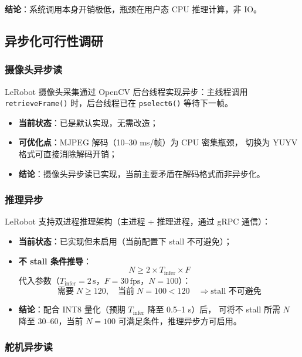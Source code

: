 \textbf{结论}：系统调用本身开销极低，瓶颈在用户态 CPU 推理计算，非 IO。

\subsection{异步化可行性调研}\label{sec:async-feasibility}

\subsubsection{摄像头异步读}

LeRobot 摄像头采集通过 OpenCV 后台线程实现异步：主线程调用
\texttt{retrieveFrame()} 时，后台线程已在 \texttt{pselect6()} 等待下一帧。
\begin{itemize}[leftmargin=2em]
  \item \textbf{当前状态}：已是默认实现，无需改造；
  \item \textbf{可优化点}：MJPEG 解码（10--30 ms/帧）为 CPU 密集瓶颈，
        切换为 YUYV 格式可直接消除解码开销；
  \item \textbf{结论}：摄像头异步读已实现，当前主要矛盾在解码格式而非异步化。
\end{itemize}

\subsubsection{推理异步}

LeRobot 支持双进程推理架构（主进程 + 推理进程，通过 gRPC 通信）：
\begin{itemize}[leftmargin=2em]
  \item \textbf{当前状态}：已实现但未启用（当前配置下 stall 不可避免）；
  \item \textbf{不 stall 条件推导}：
        \[
          N \geq 2 \times T_{\text{infer}} \times F
        \]
        代入参数（$T_{\text{infer}} = 2\,\text{s}$，$F = 30\,\text{fps}$，$N = 100$）：
        \[
          \text{需要}\; N \geq 120, \quad \text{当前}\; N = 100 < 120 \quad \Rightarrow \text{stall 不可避免}
        \]
  \item \textbf{结论}：配合 INT8 量化（预期 $T_{\text{infer}}$ 降至 0.5--1 s）后，
        可将不 stall 所需 $N$ 降至 30--60，当前 $N=100$ 可满足条件，推理异步方可启用。
\end{itemize}

\subsubsection{舵机异步读}

